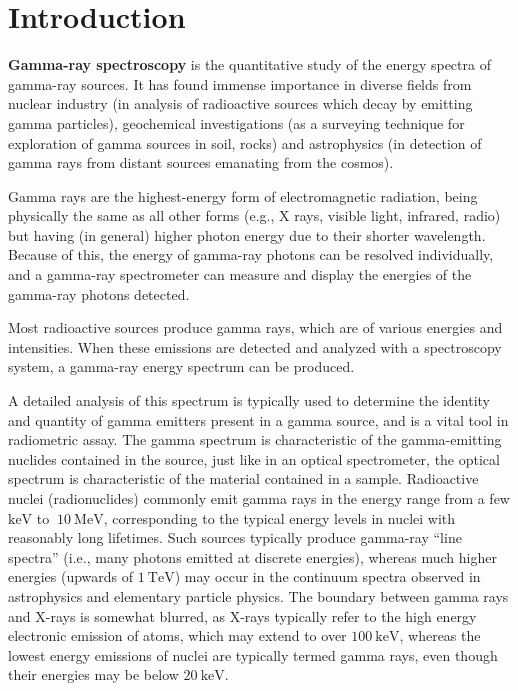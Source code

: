 \documentclass[%
 reprint,
nofootinbib,
 amsmath,amssymb,
 aps,
floatfix,
]{revtex4-2}
\begin{document}
\section{\label{sec:level1}Introduction}
    \textbf{Gamma-ray spectroscopy} is the quantitative study of the energy spectra of gamma-ray sources. It has found immense importance in diverse fields from nuclear industry (in analysis of radioactive sources which decay by emitting gamma particles), geochemical investigations (as a surveying technique for exploration of gamma sources in soil, rocks) and astrophysics (in detection of gamma rays from distant sources emanating from the cosmos).
    \par
    Gamma rays are the highest-energy form of electromagnetic radiation, being physically the same as all other forms (e.g., X rays, visible light, infrared, radio) but having (in general) higher photon energy due to their shorter wavelength. Because of this, the energy of gamma-ray photons can be resolved individually, and a gamma-ray spectrometer can measure and display the energies of the gamma-ray photons detected.
    \par
    Most radioactive sources produce gamma rays, which are of various energies and intensities. When these emissions are detected and analyzed with a spectroscopy system, a gamma-ray energy spectrum can be produced.
    \par
    A detailed analysis of this spectrum is typically used to determine the identity and quantity of gamma emitters present in a gamma source, and is a vital tool in radiometric assay. The gamma spectrum is characteristic of the gamma-emitting nuclides contained in the source, just like in an optical spectrometer, the optical spectrum is characteristic of the material contained in a sample.
    Radioactive nuclei (radionuclides) commonly emit gamma rays in the energy range from a few $\si{\kilo \electronvolt}$ to $~\SI{10}{\mega \electronvolt}$, corresponding to the typical energy levels in nuclei with reasonably long lifetimes. Such sources typically produce gamma-ray ``line spectra'' (i.e., many photons emitted at discrete energies), whereas much higher energies (upwards of $\SI{1}{\tera \electronvolt}$) may occur in the continuum spectra observed in astrophysics and elementary particle physics. The boundary between gamma rays and X-rays is somewhat blurred, as X-rays typically refer to the high energy electronic emission of atoms, which may extend to over $\SI{100}{\kilo \electronvolt}$, whereas the lowest energy emissions of nuclei are typically termed gamma rays, even though their energies may be below $\SI{20}{\kilo \electronvolt}$.
\end{document}
